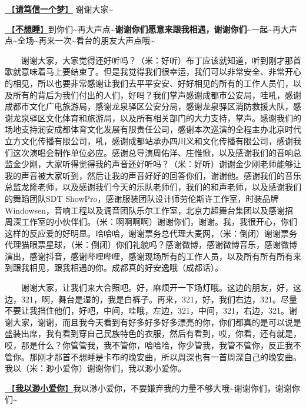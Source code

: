 \documentclass[]{ctexbook}
\begin{document}
\hyperref[believe-your-dream]{🎵【\textbf{请笃信一个梦}】} 谢谢大家\textasciitilde{}

\hyperref[donot-want-to-sleep]{🎵【\textbf{不想睡}】}到你们\textasciitilde 再大声点\textasciitilde{}\textbf{谢谢你们愿意来跟我相遇，谢谢你们\textasciitilde{}}一起\textasciitilde 再大声点\textasciitilde 全场\textasciitilde 再来一次\textasciitilde 看台的朋友大声点哦\textasciitilde{}

  谢谢大家，大家觉得还好听吗？（米：好听）布丁应该就知道，听到刚才那首歌就意味着马上要结束了。但是我觉得我们很幸运，我们可以非常安全、非常开心的相见，所以也要非常感谢让我们去平平安安、好好相见的所有的工作人员们，以及所有的背后为我们付出的人们，好吗？我们掌声感谢成都市公安局，哇吼，感谢成都市文化广电旅游局，感谢龙泉驿区公安分局，感谢龙泉驿区消防救援大队，感谢龙泉驿区文化体育和旅游局，以及所有相关部门的大力支持，掌声。感谢我们的场地支持润安成都体育文化发展有限责任公司，感谢本次巡演的全程主办北京时代立方文化传播有限公司，吼，感谢成都站承办四川义和文化传播有限公司，感谢我们这次演唱会制作单位必应。感谢总导演周佑洋、庄惟惞，以及感谢我们的音响总监金少刚，大家听得觉得我的声音还好听吗？（米：好听）谢谢金少刚老师能够让我的声音被大家听到，然后让我的声音好好的回答你们，谢谢他。感谢我们的音乐总监龙隆老师，以及感谢我们今天的乐队老师们，我们的和声老师，以及感谢我们的舞蹈团队SDT ShowPro，感谢服装团队设计师劳伦斯许工作室，时装品牌Windowsen，音响工程以及调音团队乐尔工作室，北京力超舞台集团以及感谢招周深工作室的小伙伴们。（米：啊啊啊啊）谢谢你们，谢谢。我，我很开心，你们这样的反应爱的好明显。哈哈哈，谢谢票务总代理大麦网，（米：倒闭）谢谢票务代理猫眼票星球，（米：倒闭）你们礼貌吗？感谢微博，感谢微博音乐，感谢微博演出，感谢抖音，感谢哔哩哔哩，感谢现场所有的工作人员，以及所有所有所有来到跟我相见，跟我相遇的你。成都真的好安逸哦（成都话）。

  谢谢大家，让我们来大合照吧。好，麻烦开一下场灯哦。这边的朋友，好，这边，321，啊，舞台是湿的，我是白裤子。再来，321，好，我们右边，321。尽量不要让我挡住他们，好吧，中间，哇哦，左边，321，中间，321，右边，321。谢谢大家，谢谢，而且我今天看到有好多好多好多漂亮的你，你们都真的是可以说是盛装出席，我有看到穿自己民族特色的衣服，然后有看到，哎，你看，还有就是，哎，那是什么？你管管我，我不管你，哈哈哈，你少管我，我管不管你，反正我不管你。那刚才那首不想睡是卡布的晚安曲，所以周深也有一首周深自己的晚安曲。我以（米：渺小爱你）谢谢你们，我以渺小爱你。

\hyperref[loving-you-in-my-humble-way]{🎵【\textbf{我以渺小爱你}】}我以渺小爱你，不要嫌弃我的力量不够大哦\textasciitilde 谢谢你们，谢谢你们\textasciitilde{}
\end{document}
